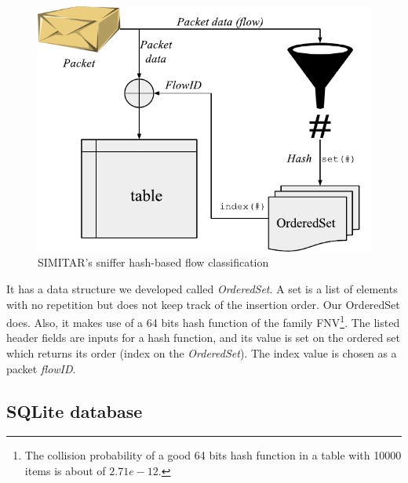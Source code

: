 \begin{figure}[ht!]
        \centering
        \includegraphics[width=\linewidth]{figures/sniffer-classifier}
        \caption{SIMITAR's sniffer hash-based flow classification}
    \label{fig:sniffer}
\end{figure}
 
It has a data structure we developed called \textit{OrderedSet}. A set is a list of elements with no repetition but does not keep track of the insertion order. Our OrderedSet does. Also, it makes use of a  64 bits hash function of the family FNV\footnote{The collision probability of a good 64 bits hash function in a table with 10000 items is about of $2.71e-12$.}. The listed header fields are inputs for a hash function, and its value is set on the ordered set which returns its order (index on the \textit{OrderedSet}). The index value is chosen as a packet \textit{flowID}.

\subsection{SQLite database}

